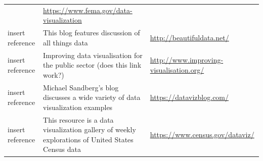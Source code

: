 \documentclass[]{book}
\begin{document}
\begin{longtable}[]{@{}lll@{}}
\begin{minipage}[t]{0.77\columnwidth}
\end{minipage} & \begin{minipage}[t]{0.07\columnwidth}\raggedright
\url{https://www.fema.gov/data-visualization}\strut
\end{minipage}\tabularnewline
\begin{minipage}[t]{0.07\columnwidth}\raggedright
insert reference\strut
\end{minipage} & \begin{minipage}[t]{0.77\columnwidth}\raggedright
This blog features discussion of all things data\strut
\end{minipage} & \begin{minipage}[t]{0.07\columnwidth}\raggedright
\url{http://beautifuldata.net/}\strut
\end{minipage}\tabularnewline
\begin{minipage}[t]{0.07\columnwidth}\raggedright
insert reference\strut
\end{minipage} & \begin{minipage}[t]{0.77\columnwidth}\raggedright
Improving data visualisation for the public sector (does this link work?)\strut
\end{minipage} & \begin{minipage}[t]{0.07\columnwidth}\raggedright
\url{http://www.improving-visualisation.org/}\strut
\end{minipage}\tabularnewline
\begin{minipage}[t]{0.07\columnwidth}\raggedright
insert reference\strut
\end{minipage} & \begin{minipage}[t]{0.77\columnwidth}\raggedright
Michael Sandberg's blog discusses a wide variety of data visualization examples\strut
\end{minipage} & \begin{minipage}[t]{0.07\columnwidth}\raggedright
\url{https://datavizblog.com/}\strut
\end{minipage}\tabularnewline
\begin{minipage}[t]{0.07\columnwidth}\raggedright
insert reference\strut
\end{minipage} & \begin{minipage}[t]{0.77\columnwidth}\raggedright
This resource is a data visualization gallery of weekly explorations of United States Census data\strut
\end{minipage} & \begin{minipage}[t]{0.07\columnwidth}\raggedright
\url{https://www.census.gov/dataviz/}\strut

\end{minipage}
\end{longtable}
\end{document}
